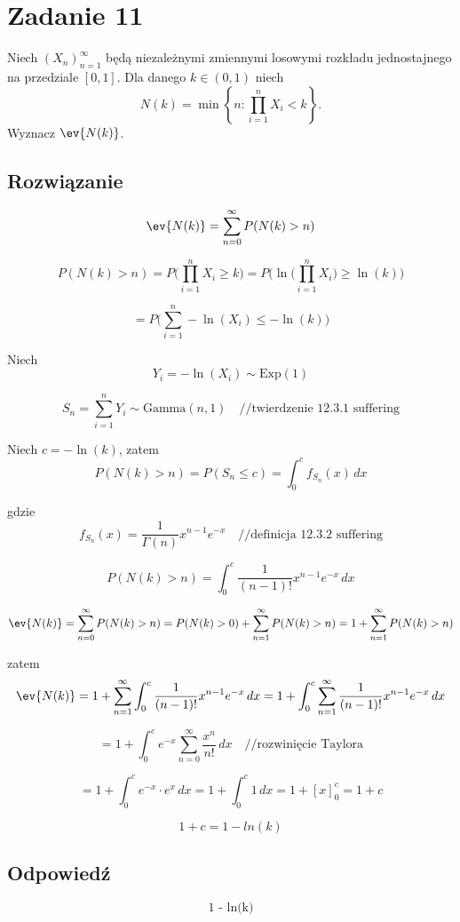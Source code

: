 \section{Zadanie 11}
Niech \((X_n)_{n=1}^{\infty}\) będą niezależnymi zmiennymi losowymi
rozkładu jednostajnego na przedziale \([0, 1]\). Dla danego \(k \in (0, 1)\)
niech
\[
	N(k) = \min \left\{ n : \prod_{i=1}^{n} X_i < k \right\}.
\]
Wyznacz \(\ev{N(k)}\).

\subsection*{Rozwiązanie}
\[
	\ev{N(k)} = \sum_{n=0}^{\infty} P(N(k) > n)
\]

\[
	P(N(k) > n) = P\Big(\prod_{i=1}^{n} X_i \ge k \Big)
	= P\Big(\ln \big(\prod_{i=1}^{n} X_i \big) \ge \ln(k) \Big)
\]

\[
	= P\Big( \sum_{i=1}^{n} -\ln(X_i) \le -\ln(k) \Big)
\]

Niech
\[
	Y_i = -\ln(X_i) \sim \text{Exp}(1)
\]

\[
	S_n = \sum_{i=1}^{n} Y_i \sim \text{Gamma}(n, 1) \quad // \text{twierdzenie 12.3.1 suffering}
\]

Niech \(c = -\ln(k)\), zatem
\[
	P(N(k) > n) = P(S_n \le c) = \int_{0}^{c} f_{S_n}(x) \, dx
\]

gdzie
\[
	f_{S_n}(x) = \frac{1}{\Gamma(n)} x^{n-1} e^{-x} \quad // \text{definicja 12.3.2 suffering}
\]

\[
	P(N(k) > n) = \int_{0}^{c} \frac{1}{(n-1)!} x^{n-1} e^{-x} \, dx
\]


\[
	\ev{N(k)} = \sum_{n=0}^{\infty} P(N(k) > n) =
	P(N(k) > 0) +  \sum_{n=1}^{\infty} P(N(k) > n) =
	1 + \sum_{n=1}^{\infty} P(N(k) > n)
\]

zatem
\[
	\ev{N(k)} = 1 + \sum_{n=1}^{\infty} \int_{0}^{c} \frac{1}{(n-1)!} x^{n-1} e^{-x} \, dx
	= 1 + \int_{0}^{c} \sum_{n=1}^{\infty} \frac{1}{(n-1)!} x^{n-1} e^{-x} \, dx
\]

\[
	= 1 + \int_{0}^{c} e^{-x} \sum_{n=0}^{\infty} \frac{x^n}{n!} \, dx \quad // \text{rozwinięcie Taylora}
\]

\[
	= 1 + \int_{0}^{c} e^{-x} \cdot e^x \, dx = 1 + \int_{0}^{c} 1 \, dx
	= 1 + [x]_0^c = 1 + c
\]


\[
	1 + c = 1 - ln(k)
\]

\subsection*{Odpowiedź}
\[
	\boxed{\text{1 - ln(k)}}
\]
